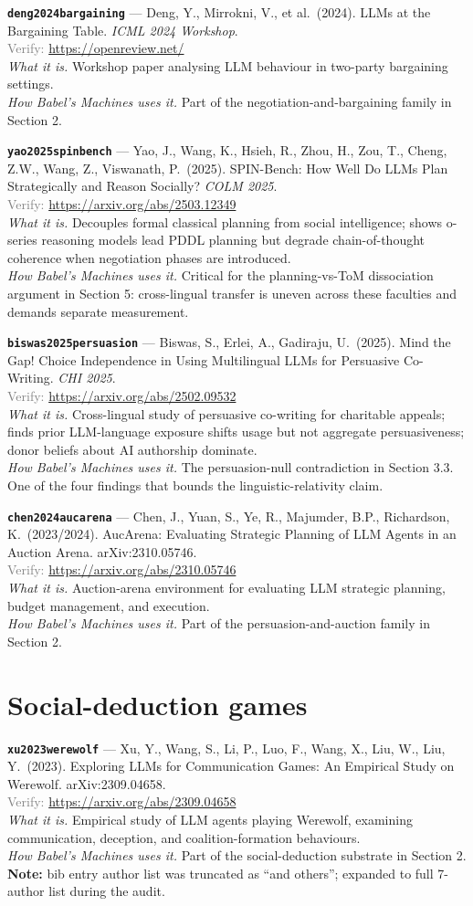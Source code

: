 \documentclass[11pt,a4paper]{article}
\newcommand{\entry}[5]{%
  \par\smallskip
  \noindent\textbf{\texttt{#1}} --- #2\\
  {\footnotesize \textcolor{gray}{Verify:} \url{#3}}\\
  \textit{What it is.} #4\\
  \textit{How Babel's Machines uses it.} #5
  \par\medskip
}
\begin{document}
\entry{deng2024bargaining}
{Deng, Y., Mirrokni, V., et al.\ (2024). LLMs at the Bargaining Table. \emph{ICML 2024 Workshop}.}
{https://openreview.net/}
{Workshop paper analysing LLM behaviour in two-party bargaining settings.}
{Part of the negotiation-and-bargaining family in Section 2.}

\entry{yao2025spinbench}
{Yao, J., Wang, K., Hsieh, R., Zhou, H., Zou, T., Cheng, Z.W., Wang, Z., Viswanath, P.\ (2025). SPIN-Bench: How Well Do LLMs Plan Strategically and Reason Socially? \emph{COLM 2025}.}
{https://arxiv.org/abs/2503.12349}
{Decouples formal classical planning from social intelligence; shows o-series reasoning models lead PDDL planning but degrade chain-of-thought coherence when negotiation phases are introduced.}
{Critical for the planning-vs-ToM dissociation argument in Section 5: cross-lingual transfer is uneven across these faculties and demands separate measurement.}

\entry{biswas2025persuasion}
{Biswas, S., Erlei, A., Gadiraju, U.\ (2025). Mind the Gap! Choice Independence in Using Multilingual LLMs for Persuasive Co-Writing. \emph{CHI 2025}.}
{https://arxiv.org/abs/2502.09532}
{Cross-lingual study of persuasive co-writing for charitable appeals; finds prior LLM-language exposure shifts usage but not aggregate persuasiveness; donor beliefs about AI authorship dominate.}
{The persuasion-null contradiction in Section 3.3. One of the four findings that bounds the linguistic-relativity claim.}

\entry{chen2024aucarena}
{Chen, J., Yuan, S., Ye, R., Majumder, B.P., Richardson, K.\ (2023/2024). AucArena: Evaluating Strategic Planning of LLM Agents in an Auction Arena. arXiv:2310.05746.}
{https://arxiv.org/abs/2310.05746}
{Auction-arena environment for evaluating LLM strategic planning, budget management, and execution.}
{Part of the persuasion-and-auction family in Section 2.}

\section{Social-deduction games}

\entry{xu2023werewolf}
{Xu, Y., Wang, S., Li, P., Luo, F., Wang, X., Liu, W., Liu, Y.\ (2023). Exploring LLMs for Communication Games: An Empirical Study on Werewolf. arXiv:2309.04658.}
{https://arxiv.org/abs/2309.04658}
{Empirical study of LLM agents playing Werewolf, examining communication, deception, and coalition-formation behaviours.}
{Part of the social-deduction substrate in Section 2. \textbf{Note:} bib entry author list was truncated as ``and others''; expanded to full 7-author list during the audit.}
\end{document}
